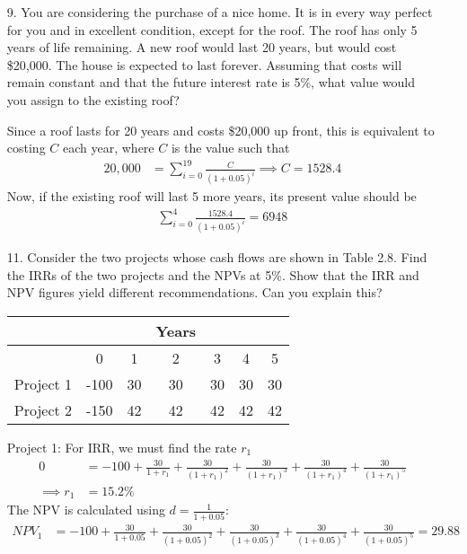 \documentclass{article}
\begin{document}
\begin{itemize}
	\item[9.] You are considering the purchase of a nice home. It is in every way perfect for you and in excellent condition, except for the roof. The roof has only 5 years of life remaining. A new roof would last 20 years, but would cost \$20,000. The house is expected to last forever. Assuming that costs will remain constant and that the future interest rate is 5\%, what value would you assign to the existing roof?
		\begin{soln}
			Since a roof lasts for 20 years and costs \$20,000 up front, this is equivalent to costing $C$ each year, where $C$ is the value such that
			\begin{align*}
				20, 000 &= \sum_{i=0}^{19} \frac{C}{(1+0.05)^i} \implies C = 1528.4
			\end{align*}
			Now, if the existing roof will last 5 more years, its present value should be
			\begin{align*}
				\sum_{i=0}^{4} \frac{1528.4}{(1+0.05)^i} = 6948
			\end{align*}
		\end{soln}

		\newpage
	\item[11.] Consider the two projects whose cash flows are shown in Table 2.8. Find the IRRs of the two projects and the NPVs at 5\%. Show that the IRR and NPV figures yield different recommendations. Can you explain this?
		\begin{center}
			\begin{tabular}{lcccccc}
				& & & Years & & & \\
				\hline
				& 0 & 1 & 2 & 3 & 4 & 5 \\
				\hline
				Project 1 & -100 & 30 & 30 & 30 & 30 & 30 \\
				Project 2 & -150 & 42 & 42 & 42 & 42 & 42 \\
				\hline
			\end{tabular}
		\end{center}
		\begin{soln}
			Project 1: For IRR, we must find the rate $r_1$
			\begin{align*}
				0 &= -100 + \frac{30}{1+r_1} + \frac{30}{(1+r_1)^2} + \frac{30}{(1+r_1)^3} + \frac{30}{(1+r_1)^4} + \frac{30}{(1+r_1)^5} \\
				\implies r_1 &= 15.2\%
			\end{align*}
			The NPV is calculated using $d=\frac{1}{1+0.05}:$
			\begin{align*}
				NPV_1 &= -100 + \frac{30}{1+0.05} + \frac{30}{(1+0.05)^2} + \frac{30}{(1+0.05)^3} + \frac{30}{(1+0.05)^4} + \frac{30}{(1+0.05)^5} = 29.88
			\end{align*}


\end{soln}
\end{itemize}
\end{document}
